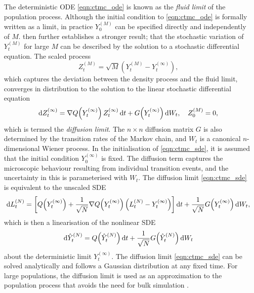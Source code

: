 The deterministic ODE \cref{eqn:ctmc_ode} is known as the \emph{fluid limit} of the population process.
Although the initial condition to \cref{eqn:ctmc_ode} is formally written as a limit, in practice \(Y_0^{(M)}\) can be specified directly and independently of \(M\).
\citet{Kurtz_1971_LimitTheoremsSequences} then further establishes a stronger result; that the stochastic variation of \(Y_t^{(M)}\) for large \(M\) can be described by the solution to a stochastic differential equation.
The scaled process
\[
	Z_t^{(M)} = \sqrt{M}\left(Y_t^{(M)} - Y_t^{(\infty)}\right),
\]
which captures the deviation between the density process and the fluid limit, converges in distribution to the solution to the linear stochastic differential equation \citep{Kurtz_1971_LimitTheoremsSequences}
\begin{equation}
	\dif Z_t^{(\infty)} = \nabla Q\!\left(Y_t^{(\infty)}\right) Z_t^{(\infty)}\dif t + G\!\left(Y_t^{(\infty)}\right)\dif W_t, \quad Z_0^{(M)} = 0,
	\label{eqn:ctmc_sde}
\end{equation}
which is termed the \emph{diffusion limit}.
The \(n\times n\) diffusion matrix \(G\) is also determined by the transition rates of the Markov chain, and \(W_t\) is a canonical \(n\)-dimensional Wiener process.
In the initialisation of \cref{eqn:ctmc_sde}, it is assumed that the initial condition \(Y_0^{(\infty)}\) is fixed.
The diffusion term captures the microscopic behaviour resulting from individual transition events, and the uncertainty in this is parameterised with \(W_t\).
The diffusion limit \cref{eqn:ctmc_sde} is equivalent to the unscaled SDE
\begin{equation}
	\dif L_t^{(N)} = \left[Q\!\left(Y_t^{(\infty)}\right) + \frac{1}{\sqrt{N}} \nabla Q\!\left(Y_t^{(\infty)}\right)\left(L_t^{(N)} - Y_t^{(\infty)}\right)\right]\dif t + \frac{1}{\sqrt{N}}G\!\left(Y_t^{(\infty)}\right)\dif W_t,
	\label{eqn:ctmc_sde_lin_lim}
\end{equation}
which is then a linearisation of the nonlinear SDE
\begin{equation}
	\dif \hat{Y}^{(N)}_t = Q\!\left(\hat{Y}^{(N)}_t\right)\dif t + \frac{1}{\sqrt{N}}G\!\left(\hat{Y}_t^{(N)}\right)\dif W_t
	\label{eqn:ctmc_sde_lim_nonlin}
\end{equation}
about the deterministic limit \(Y_t^{(\infty)}\).
The diffusion limit \cref{eqn:ctmc_sde} can be solved analytically and follows a Gaussian distribution at any fixed time.
For large populations, the diffusion limit is used as an approximation to the population process that avoids the need for bulk simulation \citep{PollettEtAl_2010_ModellingPopulationProcesses}.

